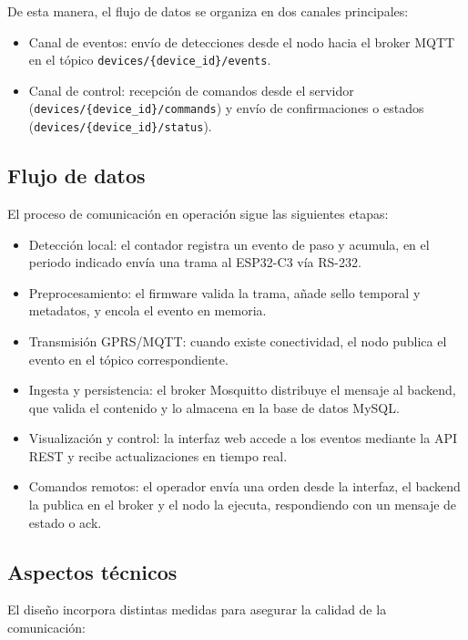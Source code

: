 De esta manera, el flujo de datos se organiza en dos canales principales:  
\begin{itemize}
    \item Canal de eventos: envío de detecciones desde el nodo hacia el 
    broker MQTT en el tópico \texttt{devices/\{device\_id\}/events}.
    \item Canal de control: recepción de comandos desde el servidor 
    (\texttt{devices/\{device\_id\}/commands}) y envío de confirmaciones o estados 
    (\texttt{devices/\{device\_id\}/status}).
\end{itemize}

\subsection{Flujo de datos}
El proceso de comunicación en operación sigue las siguientes etapas:

\begin{itemize}
    \item Detección local: el contador registra un evento de paso y acumula, en el periodo indicado envía  una trama al ESP32-C3 vía RS-232.
    \item Preprocesamiento: el firmware valida la trama, añade sello temporal y metadatos, y encola el evento en memoria.
    \item Transmisión GPRS/MQTT: cuando existe conectividad, el nodo publica  el evento en el tópico correspondiente.
    \item Ingesta y persistencia: el broker Mosquitto distribuye el mensaje al backend, que valida el contenido y lo almacena en la base de datos MySQL.
    \item Visualización y control: la interfaz web accede a los eventos 
    mediante la API REST y recibe actualizaciones en tiempo real.
    \item Comandos remotos: el operador envía una orden desde la interfaz, el backend la publica en el broker y el nodo la ejecuta, respondiendo con un mensaje de estado o ack.
\end{itemize}

\subsection{Aspectos técnicos}
El diseño incorpora distintas medidas para asegurar la calidad de la comunicación:

